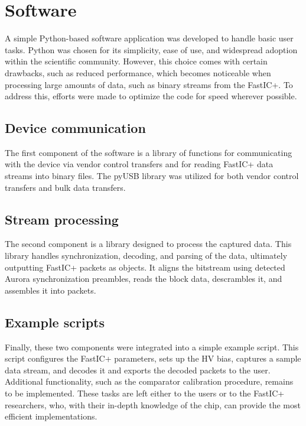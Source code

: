 \chapter{Software}
A simple Python-based software application was developed to handle basic user tasks. Python was chosen for its simplicity, ease of use, and widespread adoption within the scientific community. However, this choice comes with certain drawbacks, such as reduced performance, which becomes noticeable when processing large amounts of data, such as binary streams from the FastIC+. To address this, efforts were made to optimize the code for speed wherever possible.
\section{Device communication}
The first component of the software is a library of functions for communicating with the device via vendor control transfers and for reading FastIC+ data streams into binary files. The pyUSB library was utilized for both vendor control transfers and bulk data transfers. \cite{pyusb}

\section{Stream processing}
The second component is a library designed to process the captured data. This library handles synchronization, decoding, and parsing of the data, ultimately outputting FastIC+ packets as objects. It aligns the bitstream using detected Aurora synchronization preambles, reads the block data, descrambles it, and assembles it into packets.

\section{Example scripts}
Finally, these two components were integrated into a simple example script. This script configures the FastIC+ parameters, sets up the HV bias, captures a sample data stream, and decodes it and exports the decoded packets to the user. Additional functionality, such as the comparator calibration procedure, remains to be implemented. These tasks are left either to the users or to the FastIC+ researchers, who, with their in-depth knowledge of the chip, can provide the most efficient implementations.
